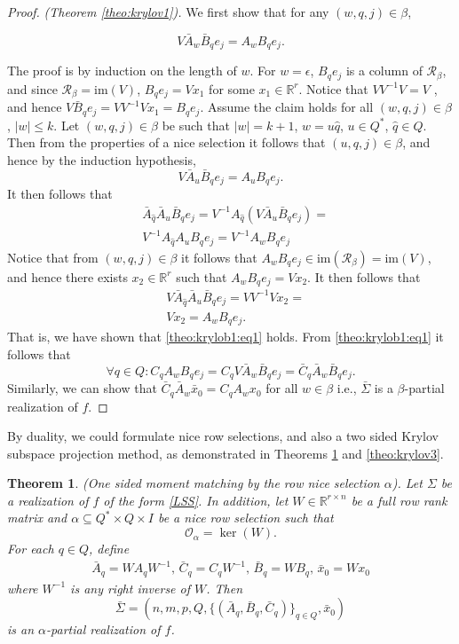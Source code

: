 \documentclass[journal]{IEEEtran}
\newcommand{\IM}{\mathrm{im}}
\newtheorem{Theorem}{Theorem}
\begin{document}
\begin{proof}\emph{(Theorem \ref{theo:krylov1}).}
	We first show that for any $(w,q,j) \in \beta$,
	
	\begin{equation}  \label{theo:krylob1:eq1}
		V\bar{A}_{w}\bar{B}_qe_j = A_{w}B_{q}e_j.
	\end{equation}
	
	The proof is by induction on the length of $w$. For $w=\epsilon$, $B_qe_j$ is a column of $\mathscr{R}_{\beta}$, and since $ \mathscr{R}_{\beta} = \IM (V)$, $B_{q}e_{j}=Vx_1$ for some $x_1 \in \mathbb{R}^r$. Notice that $VV^{-1}V=V$ , and hence $V\bar{B}_qe_j=VV^{-1}Vx_1=B_{q}e_j$. Assume the claim holds for all $(w,q,j) \in \beta$, $|w| \le k$. Let $(w,q,j) \in \beta$ be such that $|w|=k+1$, $w=u\hat{q}$, $u \in Q^{*}$, $\hat{q} \in Q$. Then from the properties of a nice selection it follows that $(u,q,j) \in \beta$, and hence by the induction hypothesis,
	\[
	V\bar{A}_u\bar{B}_qe_j=A_{u}B_{q}e_j.
	\]
	It then follows that
	\begin{align*}
		& \bar{A}_{\hat{q}}\bar{A}_u\bar{B}_qe_j = V^{-1}A_{\hat{q}}(V\bar{A}_u\bar{B}_qe_j) = \\
		& V^{-1}A_{\hat{q}}A_uB_qe_j = V^{-1}A_wB_qe_j
	\end{align*}
	Notice that from $(w,q,j) \in \beta$ it follows that $A_{w}B_qe_j \in \IM(\mathscr{R}_{\beta}) = \IM (V)$, and hence there exists $x_2 \in \mathbb{R}^{r}$ such that $A_{w}B_qe_j = Vx_2$. It then follows that
	\begin{align*}
		& V\bar{A}_{\hat{q}}\bar{A}_u\bar{B}_qe_j = VV^{-1}Vx_2 = \\
		& Vx_2=A_{w}B_{q}e_j.
	\end{align*}
	That is, we have shown that \eqref{theo:krylob1:eq1} holds.
	From \eqref{theo:krylob1:eq1} it follows that
	\[
	\forall q \in Q: C_qA_{w}B_qe_j=C_qV\bar{A}_w\bar{B}_qe_j=\bar{C}_q\bar{A}_w\bar{B}_qe_j.
	\]
	Similarly, we can show that $\bar{C}_q\bar{A}_w\bar{x}_0=C_qA_wx_0$ for all $w \in \beta$ i.e., $\bar{\Sigma}$ is a $\beta$-partial realization of $f$.
\end{proof}

By duality, we could formulate nice row selections, and also a two sided Krylov subspace projection method, as demonstrated in Theorems \ref{theo:krylov2} and \ref{theo:krylov3}.

\begin{Theorem} \label{theo:krylov2}
	\emph{(One sided moment matching by the row nice selection $\alpha$).}
	Let $\Sigma$ be a realization of $f$ of the form \eqref{LSS}. In addition, let $W \in \mathbb{R}^{r \times n}$ be a full row rank matrix and $\alpha \subseteq Q^* \times Q \times I$ be a nice row selection such that
	\[
	\mathscr{O}_\alpha = \ker (W).
	\]
	For each $q \in Q$, define
	\[
	\begin{split}
	\bar{A}_q=WA_qW^{-1} \mbox{, } \bar{C}_q=C_qW^{-1} \mbox{, } \bar{B}_q=WB_q \mbox{, } \bar{x}_0=Wx_0
	\end{split}
	\]
	where $W^{-1}$ is any right inverse of $W$. Then
	\[
	\bar{\Sigma}=(n,m,p,Q,\{(\bar{A}_q,\bar{B}_q,\bar{C}_q)\}_{q \in Q},\bar{x}_0)
	\]
	is an $\alpha$-partial realization of $f$.
\end{Theorem}
\end{document}
